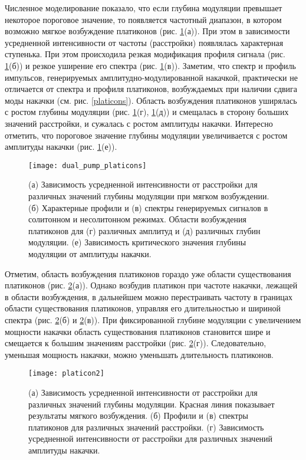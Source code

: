 Численное моделирование показало, что если глубина модуляции превышает некоторое пороговое значение, то появляется частотный диапазон, в котором возможно мягкое возбуждение платиконов (рис. \ref{dual_pump_platicons}(а)). При этом в зависимости усредненной интенсивности от частоты (расстройки) появлялась характерная ступенька. При этом происходила резкая модификация профиля сигнала (рис. \ref{dual_pump_platicons}(б)) и резкое уширение его спектра (рис. \ref{dual_pump_platicons}(в)). Заметим, что спектр и профиль импульсов, генерируемых амплитудно-модулированной накачкой, практически не отличается от спектра и профиля платиконов, возбуждаемых при наличии сдвига моды накачки (см. рис. \ref{platicons}). Область возбуждения платиконов уширялась с ростом глубины модуляции (рис. \ref{dual_pump_platicons}(г), \ref{dual_pump_platicons}(д)) и смещалась в сторону больших значений расстройки, и сужалась с ростом амплитуды накачки. Интересно отметить, что пороговое значение глубины модуляции увеличивается с ростом амплитуды накачки (рис. \ref{dual_pump_platicons}(е)).

\begin{figure}
  \centering
  \texttt{[image: dual\_pump\_platicons]}
  \caption{(а) Зависимость усредненной интенсивности от расстройки для различных значений глубины модуляции при мягком возбуждении.  (б) Характерные профили и (в) спектры генерируемых сигналов в солитонном и несолитонном режимах. Области возбуждения платиконов для (г) различных амплитуд и (д) различных глубин модуляции. (е) Зависимость критического значения глубины модуляции от амплитуды накачки.} \label{dual_pump_platicons}
\end{figure}


Отметим, область возбуждения платиконов гораздо уже области существования платиконов (рис. \ref{platicon2}(а)). Однако возбудив платикон при частоте накачки, лежащей в области возбуждения, в дальнейшем можно перестраивать частоту в границах области существования платиконов, управляя его длительностью и шириной спектра (рис. \ref{platicon2}(б) и \ref{platicon2}(в)). При фиксированной глубине модуляции с увеличением мощности накачки область существования платиконов становится шире и смещается к большим значениям расстройки (рис. \ref{platicon2}(г)). Следовательно, уменьшая мощность накачки, можно уменьшать длительность платиконов.

\begin{figure}
  \centering
  \texttt{[image: platicon2]}
  \caption{(а) Зависимость усредненной интенсивности от расстройки для различных значений глубины модуляции. Красная линия показывает результаты мягкого возбуждения. (б) Профили и (в) спектры платиконов для различных значений расстройки. (г) Зависимость усредненной интенсивности от расстройки для различных значений амплитуды накачки.} \label{platicon2}
\end{figure}

